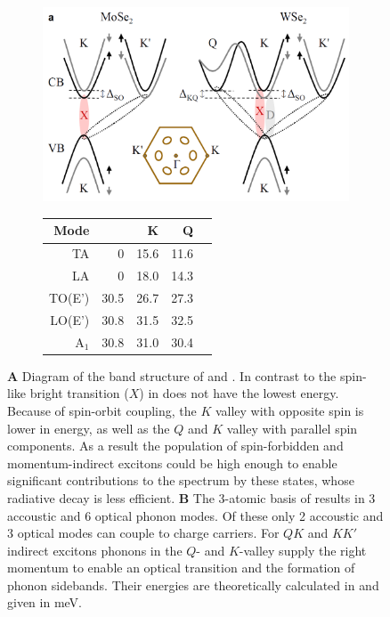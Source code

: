 \begin{figure}[t]
\centering
\begin{subfigure}{0.69\textwidth}
	\caption{}
	\includegraphics[width=.8\textwidth]{Band_structure_momentum_dark}
\end{subfigure}
\begin{subfigure}{0.3\textwidth}
	\caption{}
	\begin{tabular}{@{}rrrrr@{}}
	\toprule
	Mode&\Gamma&K&Q\\
	\midrule
	TA&0&15.6&11.6\\
	LA&0&18.0&14.3\\
	TO(E')&30.5&26.7&27.3\\
	LO(E')&30.8&31.5&32.5\\
	A$_1$&30.8&31.0&30.4\\
	\bottomrule
	\end{tabular}
\end{subfigure}
\caption{\textbf{A} Diagram of the band structure of \mose and \wse\! \cite{lindlau_identifying_2017}. In contrast to \mose the spin-like bright transition ($X$) in \wse does not have the lowest energy. Because of spin-orbit coupling, the $K$ valley with opposite spin is lower in energy, as well as the $Q$ and $K$ valley with parallel spin components. As a result the population of spin-forbidden and momentum-indirect excitons could be high enough to enable significant contributions to the \pl spectrum by these states, whose radiative decay is less efficient. \textbf{B} The 3-atomic basis of \tmds results in 3 accoustic and 6 optical phonon modes. Of these only 2 accoustic and 3 optical modes can couple to charge carriers. For $QK$ and $KK'$ indirect excitons phonons in the $Q$- and $K$-valley supply the right momentum to enable an optical transition and the formation of phonon sidebands. Their energies are theoretically calculated in  \cite{jin_intrinsic_2014} and given in meV. }\label{phonon_band}
\end{figure}

